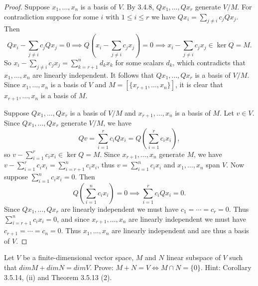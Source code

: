 \begin{proof}
    Suppose $x_1, \ldots, x_n$ is a basis of $V$.
    By 3.4.8, $Qx_1, \ldots, Qx_r$ generate $V/M$.
    For contradiction suppose for some $i$ with $1 \le i \le r$
    we have $Qx_i = \sum_{j \ne i} c_j Qx_j$.
    Then
    \[Qx_i - \sum_{j \ne i} c_j Qx_j = 0 \implies Q\!\left(x_i - \sum_{j \ne i} c_j x_j\right) = 0 \implies x_i - \sum_{j \ne i} c_j x_j \in \ker Q = M.\]
    So $x_i - \sum_{j \ne i} c_j x_j = \sum_{k=r+1}^{n} d_k x_k$ for some scalars $d_k$,
    which contradicts that $x_1, \ldots, x_n$ are linearly independent.
    It follows that $Qx_1, \ldots, Qx_r$ is a basis of $V/M$.
    Since $x_1, \ldots, x_n$ is a basis of $V$ and $M = [\{x_{r+1}, \ldots, x_n\}]$,
    it is clear that $x_{r+1}, \ldots, x_n$ is a basis of $M$.

    Suppose $Qx_1, \ldots, Qx_r$ is a basis of $V/M$ and $x_{r+1}, \ldots, x_n$ is a basis of $M$.
    Let $v \in V$. Since $Qx_1, \ldots, Qx_r$ generate $V/M$, we have
    \[Qv = \sum_{i=1}^{r} c_i Qx_i = Q\!\left(\sum_{i=1}^{r} c_i x_i\right),\]
    so $v - \sum_{i=1}^{r} c_i x_i \in \ker Q = M$.
    Since $x_{r+1}, \ldots, x_n$ generate $M$, we have $v - \sum_{i=1}^{r} c_i x_i = \sum_{i=r+1}^{n} c_i x_i$,
    thus $v = \sum_{i=1}^{n} c_i x_i$ and $x_1, \ldots, x_n$ span $V$.
    Now suppose $\sum_{i=1}^{n} c_i x_i = 0$. Then
    \[Q\!\left(\sum_{i=1}^{n} c_i x_i\right) = 0 \implies \sum_{i=1}^{r} c_i Qx_i = 0.\]
    Since $Qx_1, \ldots, Qx_r$ are linearly independent we must have $c_1 = \cdots = c_r = 0$.
    Thus $\sum_{i=r+1}^{n} c_i x_i = 0$, and since $x_{r+1}, \ldots, x_n$ are linearly independent
    we must have $c_{r+1} = \cdots = c_n = 0$.
    Thus $x_1, \ldots, x_n$ are linearly independent and are thus a basis of $V$.
\end{proof}

\begin{tcolorbox}[title=Problem 26, breakable]
    Let $V$ be a finite-dimensional vector space,
    $M$ and $N$ linear subspace of $V$ such that 
    $dim M + dim N = dim V$. Prove: $M + N = V \iff M \cap N = \{0\}$.
    {Hint: Corollary 3.5.14, (ii) and Theorem 3.5.13 (2).}
\end{tcolorbox}

